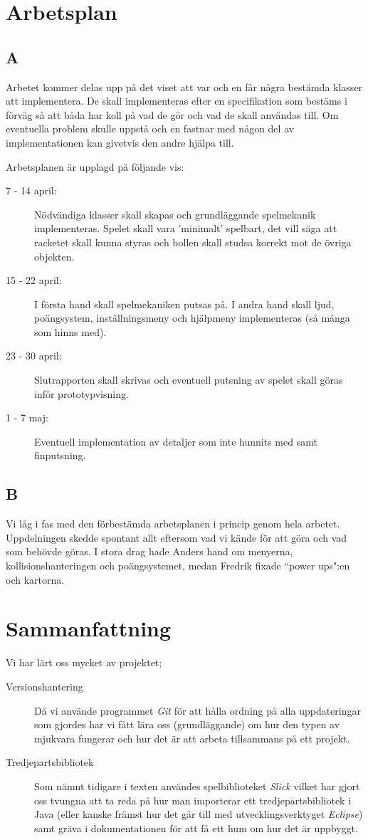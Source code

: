 \documentclass[11pt,a4paper]{article}
\begin{document}
\section{Arbetsplan}

\subsection{A}
Arbetet kommer delas upp på det viset att var och en får några bestämda klasser att implementera. De skall implementeras efter en specifikation som bestäms i förväg så att båda har koll på vad de gör och vad de skall användas till. Om eventuella problem skulle uppstå och en fastnar med någon del av implementationen kan givetvis den andre hjälpa till.

Arbetsplanen är upplagd på följande vis:

\begin{description}
	\item[7 - 14 april:] Nödvändiga klasser skall skapas och grundläggande spelmekanik implementeras. Spelet skall vara 'minimalt' spelbart, det vill säga att racketet skall kunna styras och bollen skall studsa korrekt mot de övriga objekten.
	\item[15 - 22 april:] I första hand skall spelmekaniken putsas på. I andra hand skall ljud, poängsystem, inställningsmeny och hjälpmeny implementeras (så många som hinns med).
	\item[23 - 30 april:] Slutrapporten skall skrivas och eventuell putsning av spelet skall göras inför prototypvisning.
	\item[1 - 7 maj:] Eventuell implementation av detaljer som inte hunnits med samt finputsning.
\end{description}

\subsection{B}
Vi låg i fas med den förbestämda arbetsplanen i princip genom hela arbetet. Uppdelningen skedde spontant allt eftersom vad vi kände för att göra och vad som behövde göras. I stora drag hade Anders hand om menyerna, kollisionshanteringen och poängsystemet, medan Fredrik fixade ``power ups":en och kartorna.

\section{Sammanfattning}
Vi har lärt oss mycket av projektet;

\begin{description}
	\item[Versionshantering] Då vi använde programmet \emph{Git} för att hålla ordning på alla uppdateringar som gjordes har vi fått lära oss (grundläggande) om hur den typen av mjukvara fungerar och hur det är att arbeta tillsammans på ett projekt.
	\item[Tredjepartsbibliotek] Som nämnt tidigare i texten användes spelbiblioteket \emph{Slick} vilket har gjort oss tvungna att ta reda på hur man importerar ett tredjepartsbibliotek i Java (eller kanske främst hur det går till med utvecklingsverktyget \emph{Eclipse}) samt gräva i dokumentationen för att få ett hum om hur det är uppbyggt.
\end{description}
\end{document}
